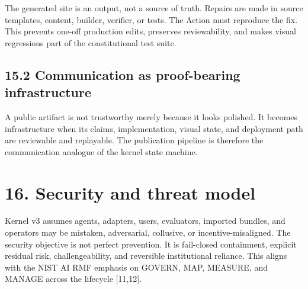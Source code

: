 The generated site is an output, not a source of truth. Repairs are made
in source templates, content, builder, verifier, or tests. The Action
must reproduce the fix. This prevents one-off production edits,
preserves reviewability, and makes visual regressions part of the
constitutional test suite.

\subsection{15.2 Communication as proof-bearing
infrastructure}\label{communication-as-proof-bearing-infrastructure}

A public artifact is not trustworthy merely because it looks polished.
It becomes infrastructure when its claims, implementation, visual state,
and deployment path are reviewable and replayable. The publication
pipeline is therefore the communication analogue of the kernel state
machine.

\section{16. Security and threat model}\label{security-and-threat-model}

Kernel v3 assumes agents, adapters, users, evaluators, imported bundles,
and operators may be mistaken, adversarial, collusive, or
incentive-misaligned. The security objective is not perfect prevention.
It is fail-closed containment, explicit residual risk, challengeability,
and reversible institutional reliance. This aligns with the NIST AI RMF
emphasis on GOVERN, MAP, MEASURE, and MANAGE across the lifecycle
{[}11,12{]}.

